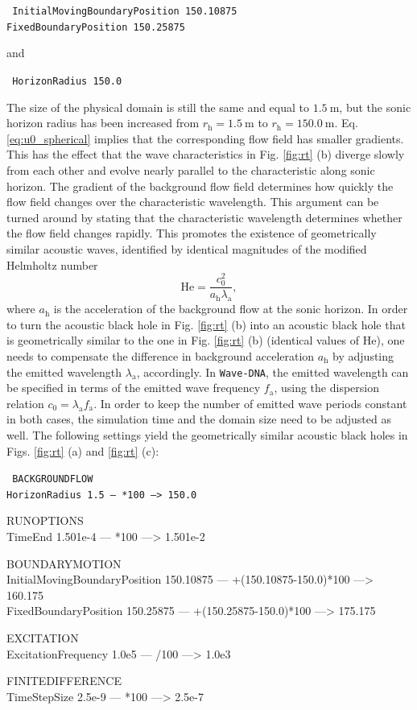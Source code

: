 {\tt
InitialMovingBoundaryPosition 150.10875  \\
FixedBoundaryPosition 150.25875
}

and

{\tt
HorizonRadius 150.0
}

The size of the physical domain is still the same and equal to $1.5\:\mathrm{m}$, but the sonic horizon radius has been increased from $r_{\mathrm{h}}=1.5\:\mathrm{m}$ to $r_{\mathrm{h}}=150.0\:\mathrm{m}$. Eq. \eqref{eq:u0_spherical} implies that the corresponding flow field has smaller gradients. This has the effect that the wave characteristics in Fig. \ref{fig:rt} (b) diverge slowly from each other and evolve nearly parallel to the characteristic along sonic horizon. The gradient of the background flow field determines how quickly the flow field changes over the characteristic wavelength. This argument can be turned around by stating that the characteristic wavelength determines whether the flow field changes rapidly. This promotes the existence of geometrically similar acoustic waves, identified by identical magnitudes of the modified Helmholtz number
\begin{equation}
\mathrm{He} = \dfrac{c_0^2}{a_{\mathrm{h}}\lambda_{\mathrm{a}}},
\label{eq:Helmholtz}
\end{equation}
where $a_{\mathrm{h}}$ is the acceleration of the background flow at the sonic horizon. In order to turn the acoustic black hole in Fig. \ref{fig:rt} (b) into an acoustic black hole that is geometrically similar to the one in Fig. \ref{fig:rt} (b) (identical values of $\mathrm{He}$), one needs to compensate the difference in background acceleration $a_{\mathrm{h}}$ by adjusting the emitted wavelength $\lambda_{\mathrm{a}}$, accordingly. In {\tt Wave-DNA}, the emitted wavelength can be specified in terms of the emitted wave frequency $f_{\mathrm{a}}$, using the dispersion relation $c_0=\lambda_{\mathrm{a}}f_{\mathrm{a}}$. In order to keep the number of emitted wave periods constant in both cases, the simulation time and the domain size need to be adjusted as well. The following settings yield the geometrically similar acoustic black holes in Figs. \ref{fig:rt} (a) and \ref{fig:rt} (c):

{\tt
BACKGROUNDFLOW \\
HorizonRadius 1.5 --- *100 ---> 150.0

RUNOPTIONS \\
TimeEnd 1.501e-4 --- *100 ---> 1.501e-2

BOUNDARYMOTION \\
InitialMovingBoundaryPosition 150.10875 --- +(150.10875-150.0)*100 ---> 160.175 \\
FixedBoundaryPosition 150.25875 --- +(150.25875-150.0)*100 ---> 175.175

EXCITATION \\
ExcitationFrequency 1.0e5 --- /100 ---> 1.0e3

FINITEDIFFERENCE \\
TimeStepSize 2.5e-9 --- *100 ---> 2.5e-7
}

